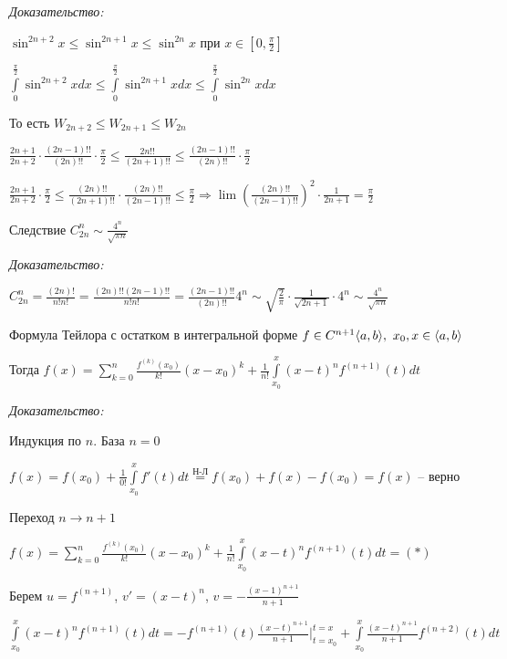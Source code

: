 \documentclass[12pt]{article}
\begin{document}
\textit{Доказательство:}

$\sin^{2n + 2}x \leq \sin^{2n + 1}x \leq \sin^{2n}x$ при $x \in [0, \frac{\pi}{2}]$

$\int\limits_0^\frac{\pi}{2} \sin^{2n + 2}x dx \leq \int\limits_0^\frac{\pi}{2} \sin^{2n + 1}x dx \leq \int\limits_0^\frac{\pi}{2} \sin^{2n}x dx$

То есть $W_{2n + 2} \leq W_{2n + 1} \leq W_{2n}$

$\frac{2n + 1}{2n + 2} \cdot \frac{(2n - 1)!!}{(2n)!!} \cdot \frac{\pi}{2} \leq \frac{2n!!}{(2n + 1)!!} \leq \frac{(2n - 1)!!}{(2n)!!} \cdot \frac{\pi}{2}$

$\frac{2n + 1}{2n + 2} \cdot \frac{\pi}{2} \leq \frac{(2n)!!}{(2n + 1)!!} \cdot \frac{(2n)!!}{(2n - 1)!!} \leq \frac{\pi}{2} \Rightarrow \lim (\frac{(2n)!!}{(2n - 1)!!})^2 \cdot \frac{1}{2n + 1} = \frac{\pi}{2}$

\begin{theo}{Следствие}
    $C_{2n}^n \sim \frac{4^n}{\sqrt{\pi n}}$
\end{theo}

\textit{Доказательство:}

$C_{2n}^n = \frac{(2n)!}{n!n!} = \frac{(2n)!!(2n-1)!!}{n!n!} = \frac{(2n - 1)!!}{(2n)!!} 4^n \sim \sqrt{\frac{2}{\pi}} \cdot \frac{1}{\sqrt{2n + 1}} \cdot 4^n \sim \frac{4^n}{\sqrt{\pi n}}$

\begin{theo}{Формула Тейлора с остатком в интегральной форме}
    $f \in C^{n+1}\langle a, b \rangle,\ x_0, x \in \langle a, b \rangle$

    Тогда $f(x) = \sum\limits_{k = 0}^n \frac{f^{(k)}(x_0)}{k!}(x - x_0)^k + \frac{1}{n!} \int\limits_{x_0}^x (x - t)^n f^{(n+1)}(t)dt$
\end{theo}

\textit{Доказательство:}

Индукция по $n$. База $n = 0$

$f(x) = f(x_0) + \frac{1}{0!} \int\limits_{x_0}^x f'(t)dt \stackrel{\text{Н-Л}}{=} f(x_0) + f(x) - f(x_0) = f(x)$ -- верно

Переход $n \to n + 1$

$f(x) = \sum\limits_{k = 0}^n \frac{f^{(k)}(x_0)}{k!}(x - x_0)^k + \frac{1}{n!} \int\limits_{x_0}^x (x - t)^n f^{(n+1)}(t)dt = (*)$

Берем $u = f^{(n + 1)}$, $v' = (x - t)^n$, $v = -\frac{(x - 1)^{n + 1}}{n + 1}$

$\int\limits_{x_0}^x (x-t)^n f^{(n + 1)}(t)dt = -f^{(n + 1)}(t) \frac{(x - t)^{n + 1}}{n + 1}|_{t = x_0}^{t = x} + \int\limits_{x_0}^x \frac{(x - t)^{n + 1}}{n + 1} f^{(n + 2)}(t)dt$
\end{document}
